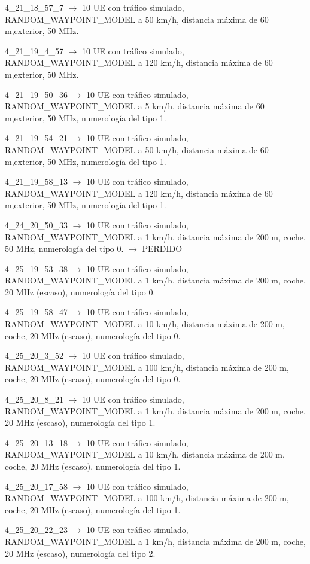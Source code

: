 \documentclass[12pt]{report} %
\begin{document}
4\_21\_18\_57\_7 $\rightarrow$ 10 UE con tráfico simulado, RANDOM\_WAYPOINT\_MODEL a 50 km/h, distancia máxima de 60 m,exterior, 50 MHz.

4\_21\_19\_4\_57 $\rightarrow$ 10 UE con tráfico simulado, RANDOM\_WAYPOINT\_MODEL a 120 km/h, distancia máxima de 60 m,exterior, 50 MHz.

4\_21\_19\_50\_36 $\rightarrow$ 10 UE con tráfico simulado, RANDOM\_WAYPOINT\_MODEL a 5 km/h, distancia máxima de 60 m,exterior, 50 MHz, numerología del tipo 1.

4\_21\_19\_54\_21 $\rightarrow$ 10 UE con tráfico simulado, RANDOM\_WAYPOINT\_MODEL a 50 km/h, distancia máxima de 60 m,exterior, 50 MHz, numerología del tipo 1.

4\_21\_19\_58\_13 $\rightarrow$ 10 UE con tráfico simulado, RANDOM\_WAYPOINT\_MODEL a 120 km/h, distancia máxima de 60 m,exterior, 50 MHz, numerología del tipo 1.

4\_24\_20\_50\_33 $\rightarrow$ 10 UE con tráfico simulado, RANDOM\_WAYPOINT\_MODEL a 1 km/h, distancia máxima de 200 m, coche, 50 MHz, numerología del tipo 0.  $\rightarrow$  PERDIDO

4\_25\_19\_53\_38 $\rightarrow$ 10 UE con tráfico simulado, RANDOM\_WAYPOINT\_MODEL a 1 km/h, distancia máxima de 200 m, coche, 20 MHz (escaso), numerología del tipo 0.

4\_25\_19\_58\_47 $\rightarrow$ 10 UE con tráfico simulado, RANDOM\_WAYPOINT\_MODEL a 10 km/h, distancia máxima de 200 m, coche, 20 MHz (escaso), numerología del tipo 0.

4\_25\_20\_3\_52 $\rightarrow$ 10 UE con tráfico simulado, RANDOM\_WAYPOINT\_MODEL a 100 km/h, distancia máxima de 200 m, coche, 20 MHz (escaso), numerología del tipo 0.

4\_25\_20\_8\_21 $\rightarrow$ 10 UE con tráfico simulado, RANDOM\_WAYPOINT\_MODEL a 1 km/h, distancia máxima de 200 m, coche, 20 MHz (escaso), numerología del tipo 1.

4\_25\_20\_13\_18 $\rightarrow$ 10 UE con tráfico simulado, RANDOM\_WAYPOINT\_MODEL a 10 km/h, distancia máxima de 200 m, coche, 20 MHz (escaso), numerología del tipo 1.

4\_25\_20\_17\_58 $\rightarrow$ 10 UE con tráfico simulado, RANDOM\_WAYPOINT\_MODEL a 100 km/h, distancia máxima de 200 m, coche, 20 MHz (escaso), numerología del tipo 1.

4\_25\_20\_22\_23 $\rightarrow$ 10 UE con tráfico simulado, RANDOM\_WAYPOINT\_MODEL a 1 km/h, distancia máxima de 200 m, coche, 20 MHz (escaso), numerología del tipo 2.
\end{document}
